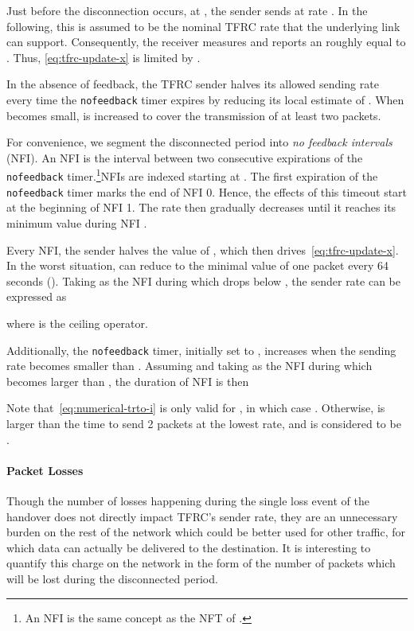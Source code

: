 \documentclass[twocolumn]{nictatechreport}
\begin{document}
Just before the disconnection occurs, at , the sender sends at rate .
In the following, this is assumed to be the nominal TFRC rate that the
underlying link can support. Consequently, the receiver measures and reports an
 roughly equal to .  Thus, \eqref{eq:tfrc-update-x}
is limited by .

In the absence of feedback, the TFRC sender halves its allowed sending rate
every time the \verb#nofeedback# timer expires by reducing its local estimate of
. When  becomes small,  is increased to
cover the transmission of at least two packets.

For convenience, we segment the disconnected period into \emph{no feedback
intervals} (NFI). An NFI is the interval between two consecutive expirations of
the \verb#nofeedback# timer.\footnote{An NFI is the same concept as the NFT of \cite{draft-ietf-dccp-tfrc-faster-restart-06}.}NFIs are indexed starting at
. The first expiration of the \verb#nofeedback# timer marks the end of NFI
0. Hence, the effects of this timeout start at the beginning of NFI 1.  The rate
then gradually decreases until it reaches its minimum value during NFI .

Every NFI, the sender halves the value of , which then
drives~\eqref{eq:tfrc-update-x}. In the worst situation,  can reduce to the
minimal value of one packet every 64 seconds ().  Taking 
as the NFI during which  drops below ,
the sender rate can be expressed as

where  is the ceiling operator.

Additionally, the \verb#nofeedback# timer, initially set to
, increases when the sending rate becomes smaller than
. Assuming  and taking  as the NFI during which
 becomes larger than , the duration of NFI  is then

Note that~\eqref{eq:numerical-trto-i} is only valid for , in
which case . Otherwise,  is larger than the time to send 2
packets at the lowest rate, and  is considered to be .

\paragraph{Packet Losses}

Though the number of losses happening during the single loss event of the
handover does not directly impact TFRC's sender rate, they are an unnecessary
burden on the rest of the network which could be better used for other traffic,
for which data can actually be delivered to the destination. It is interesting
to quantify this charge on the network in the form of the number of packets
which will be lost during the disconnected period.
\end{document}
